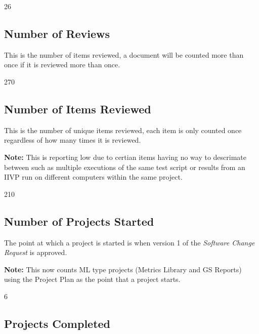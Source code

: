 \documentclass{article}
\begin{document}
\begin{Schunk}
\begin{Soutput}
[1] 26
\end{Soutput}
\end{Schunk}

\subsection{Number of Reviews}
This is the number of items reviewed, a document will be counted more than once
if it is reviewed more than once.

\begin{Schunk}
\begin{Soutput}
[1] 270
\end{Soutput}
\end{Schunk}

\subsection{Number of Items Reviewed}
This is the number of unique items reviewed, each item is only counted once
regardless of how many times it is reviewed.

\textbf{Note:} This is reporting low due to certian items having no way to
descrimate between such as multiple executions of the same test script or
results from an IIVP run on different computers within the same project.

\begin{Schunk}
\begin{Soutput}
[1] 210
\end{Soutput}
\end{Schunk}

\subsection{Number of Projects Started}
The point at which a project is started is when version 1 of the \textit{Software
Change Request} is approved.

\textbf{Note:} This now counts ML type projects (Metrics Library and GS Reports)
using the Project Plan as the point that a project starts.

\begin{Schunk}
\begin{Soutput}
[1] 6
\end{Soutput}
\end{Schunk}

\subsection{Projects Completed}
\end{document}
